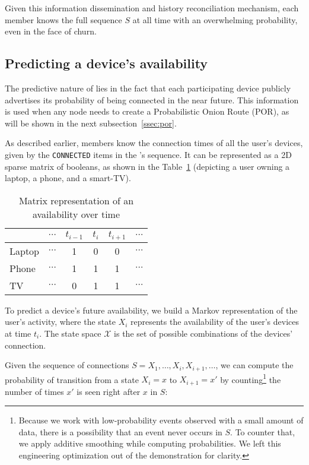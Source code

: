 Given this information dissemination and history reconciliation mechanism, each \squad member knows the full sequence $S$ at all time with an overwhelming probability, even in the face of churn.

\subsection{Predicting a device's availability}
\label{ssec:device_availability}

The predictive nature of \name lies in the fact that each participating device publicly advertises its probability of being connected in the near future. 
This information is used when any node needs to create a Probabilistic Onion Route (POR), as will be shown in the next subsection~\ref{ssec:por}.

As described earlier, \squad members know the connection times of all the user's devices, given by the \texttt{CONNECTED} items in the \squad's sequence.
It can be represented as a 2D sparse matrix of booleans, as shown in the Table~\ref{tab:connection_times} (depicting a user owning a laptop, a phone, and a smart-TV).


\begin{table}
\caption{Matrix representation of an \squad availability over time}
\centering
\begin{tabular}{@{}lccccc@{}} \toprule
		& $\cdots$	& $t_{i-1}$	& $t_i$		& $t_{i+1}$	& $\cdots$ \\ \midrule
Laptop	& $\cdots$	& 1			& 0			& 0			& $\cdots$ \\
Phone	& $\cdots$	& 1			& 1			& 1			& $\cdots$ \\
TV		& $\cdots$	& 0			& 1			& 1			& $\cdots$ \\ \bottomrule
\end{tabular}
\label{tab:connection_times}
\end{table}

To predict a device's future availability, we build a Markov representation of the user's activity, 
where the state $X_i$ represents the availability of the user's devices at time $t_i$.
The state space $\mathcal{X}$ is the set of possible combinations of the devices' connection.

Given the \squad sequence of connections $S = X_1, \dots, X_i, X_{i+1}, \dots$,
we can compute the probability of transition from a state $X_i=x$ to $X_{i+1}=x'$ by counting\footnote{%
	Because we work with low-probability events observed with a small amount of data, there is a possibility that an event never occurs in $S$. 
	To counter that, we apply additive smoothing while computing probabilities. 
	We left this engineering optimization out of the demonstration for clarity.
} the number of times $x'$ is seen right after $x$ in $S$:

